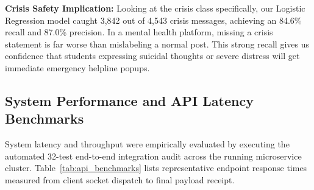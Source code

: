 \noindent \textbf{Crisis Safety Implication:} Looking at the crisis class specifically, our Logistic Regression model caught 3,842 out of 4,543 crisis messages, achieving an 84.6\% recall and 87.0\% precision. In a mental health platform, missing a crisis statement is far worse than mislabeling a normal post. This strong recall gives us confidence that students expressing suicidal thoughts or severe distress will get immediate emergency helpline popups.

\subsection{System Performance and API Latency Benchmarks}
System latency and throughput were empirically evaluated by executing the automated 32-test end-to-end integration audit across the running microservice cluster. Table~\ref{tab:api_benchmarks} lists representative endpoint response times measured from client socket dispatch to final payload receipt.

